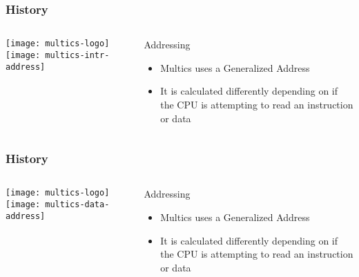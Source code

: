 \begin{frame}[plain]
	\frametitle{History}
	
	
	
	\begin{columns}
		
		\begin{column}{.5\textwidth}
			\texttt{[image: multics-logo]}
			\texttt{[image: multics-intr-address]}
			
			
			
		\end{column}
		
		\begin{column}{.5\textwidth}
			
			\Large
			Addressing
			\begin{itemize}
				\item  Multics uses a Generalized Address
				\item  It is calculated
				differently depending
				on if the CPU is
				attempting to read an
				instruction or data

				
			\end{itemize}	
			
		\end{column}
		
		
	\end{columns}
	
	
\end{frame}


\begin{frame}[plain]
	\frametitle{History}
	
	
	
	\begin{columns}
		
		\begin{column}{.5\textwidth}
			\texttt{[image: multics-logo]}
			\texttt{[image: multics-data-address]}
			
			
			
		\end{column}
		
		\begin{column}{.5\textwidth}
			
			\Large
			Addressing
			\begin{itemize}
				\item  Multics uses a Generalized Address
				\item  It is calculated
				differently depending
				on if the CPU is
				attempting to read an
				instruction or data
				
				
			\end{itemize}	
			
		\end{column}
		
		
	\end{columns}
	
	
\end{frame}


